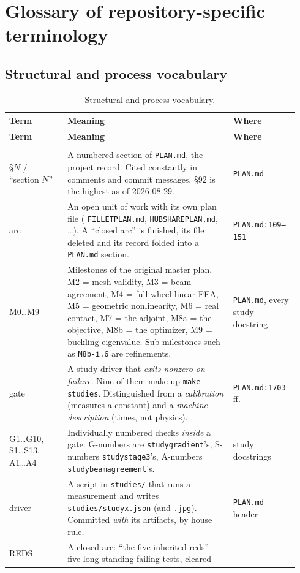 \documentclass[11pt,a4paper]{article}
\makeatletter
\DeclareRobustCommand{\code}[1]{%
  \texttt{\small\def\_{\textunderscore\discretionary{}{}{}}#1}}
\newcommand{\at}[2]{\code{#1:#2}}
\newenvironment{termtable}[1]
  {\small\begin{longtable}{@{}>{\raggedright\arraybackslash}p{0.19\linewidth}
                             >{\raggedright\arraybackslash}p{0.54\linewidth}
                             >{\raggedright\arraybackslash}p{0.21\linewidth}@{}}
   \caption{#1}\\
   \toprule
   \textbf{Term} & \textbf{Meaning} & \textbf{Where} \\
   \midrule
   \endfirsthead
   \toprule
   \textbf{Term} & \textbf{Meaning} & \textbf{Where} \\
   \midrule
   \endhead
   \midrule
   \multicolumn{3}{r@{}}{\emph{continued on the next page}}\\
   \endfoot
   \bottomrule
   \endlastfoot}
  {\end{longtable}}
\makeatother
\begin{document}
\section{Glossary of repository-specific terminology}
\label{sec:glossary}

\subsection{Structural and process vocabulary}

\begin{termtable}{Structural and process vocabulary.}
\S$N$ / ``section $N$'' &
  A numbered section of \code{PLAN.md}, the project record. Cited constantly in
  comments and commit messages. \S92 is the highest as of 2026-08-29. &
  \code{PLAN.md} \\
\addlinespace
arc &
  An open unit of work with its own plan file (\code{FILLET\_PLAN.md},
  \code{HUBSHARE\_PLAN.md}, \ldots). A ``closed arc'' is finished, its file deleted and
  its record folded into a \code{PLAN.md} section. &
  \at{PLAN.md}{109--151} \\
\addlinespace
M0\ldots M9 &
  Milestones of the original master plan. M2 = mesh validity, M3 = beam agreement,
  M4 = full-wheel linear FEA, M5 = geometric nonlinearity, M6 = real contact,
  M7 = the adjoint, M8a = the objective, M8b = the optimizer, M9 = buckling
  eigenvalue. Sub-milestones such as \code{M8b-i.6} are refinements. &
  \code{PLAN.md}, every study docstring \\
\addlinespace
gate &
  A study driver that \emph{exits nonzero on failure}. Nine of them make up
  \code{make studies}. Distinguished from a \emph{calibration} (measures a constant)
  and a \emph{machine description} (times, not physics). &
  \at{PLAN.md}{1703}\,ff. \\
\addlinespace
G1\ldots G10, S1\ldots S13, A1\ldots A4 &
  Individually numbered checks \emph{inside} a gate. G-numbers are
  \code{study\_gradient}'s, S-numbers \code{study\_stage3}'s, A-numbers
  \code{study\_beam\_agreement}'s. &
  study docstrings \\
\addlinespace
driver &
  A script in \code{studies/} that runs a measurement and writes
  \code{studies/study\_x.json} (and \code{.jpg}). Committed \emph{with} its artifacts,
  by house rule. &
  \code{PLAN.md} header \\
\addlinespace
REDS &
  A closed arc: ``the five inherited reds''---five long-standing failing tests, cleared

\end{termtable}
\end{document}
